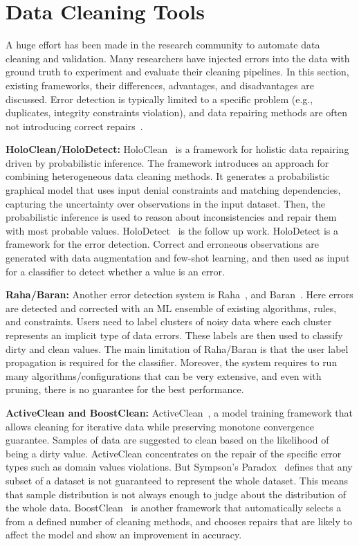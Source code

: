
\section{Data Cleaning Tools}
\label{sec:data_cleaning_tools}

A huge effort has been made in the research community to automate data cleaning and validation. 
Many researchers have injected errors into the data with ground truth to experiment and evaluate their cleaning pipelines.
In this section, existing frameworks, their differences, advantages, and disadvantages are discussed.
Error detection is typically limited to a specific problem (e.g., duplicates, integrity constraints violation), and data repairing methods are often not introducing correct repairs~\cite{RekatsinasCIR2017}.

\textbf{HoloClean/HoloDetect:} 
HoloClean~\cite{RekatsinasCIR2017} is a framework for holistic data repairing driven by probabilistic inference. The framework introduces an approach for combining heterogeneous data cleaning methods.
It generates a probabilistic graphical model that uses input denial constraints and matching dependencies, capturing the uncertainty over observations in the input dataset. 
Then, the probabilistic inference is used to reason about inconsistencies and repair them with most probable values. %
HoloDetect~\cite{HeidariMIR2019} is the follow up work. HoloDetect is a framework for the error detection.
Correct and erroneous observations are generated with data augmentation and few-shot learning, and then used as input for a classifier to detect whether a value is an error.

\textbf{Raha/Baran:} 
Another error detection system is Raha~\cite{raha}, and Baran~\cite{baran}.
Here errors are detected and corrected with an ML ensemble of existing algorithms, rules, and constraints.
Users need to label clusters of noisy data where each cluster represents an implicit type of data errors.
These labels are then used to classify dirty and clean values. 
The main limitation of Raha/Baran is that the user label propagation is required for the classifier.
Moreover, the system requires to run many algorithms/configurations that can be very extensive, and even with pruning, there is no guarantee for the best performance.

\textbf{ActiveClean and BoostClean:} 
ActiveClean~\cite{activeclean}, a model training framework that allows cleaning for iterative data while preserving monotone convergence guarantee.
Samples of data are suggested to clean based on the likelihood of being a dirty value.
ActiveClean concentrates on the repair of the specific error types such as domain values violations.
But Sympson's Paradox~\cite{activeclean} defines that any subset of a dataset is not guaranteed to represent the whole dataset.
This means that sample distribution is not always enough to judge about the distribution of the whole data. 
BoostClean~\cite{boostclean} is another framework that automatically selects a from a defined number of cleaning methods, and chooses repairs that are likely to affect the model and show an improvement in accuracy. 

